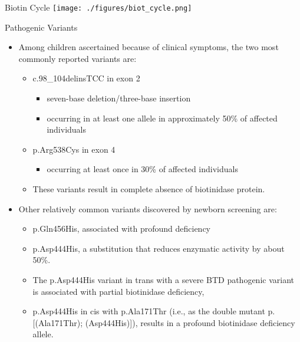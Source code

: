 \documentclass[presentation, smaller]{beamer}
\begin{document}
\begin{frame}[label={sec:orgheadline3}]{Biotin Cycle}
\texttt{[image: ./figures/biot\_cycle.png]}
\end{frame}


\begin{frame}[label={sec:orgheadline4}]{Pathogenic Variants}
\begin{itemize}
\item Among children ascertained because of clinical symptoms, the two
most commonly reported variants are:

\begin{itemize}
\item c.98\_104delinsTCC in exon 2
\begin{itemize}
\item seven-base deletion/three-base insertion
\item occurring in at least one allele in approximately 50\% of affected individuals
\end{itemize}

\item p.Arg538Cys in exon 4
\begin{itemize}
\item occurring at least once in 30\% of affected individuals
\end{itemize}

\item These variants result in complete absence of biotinidase protein.
\end{itemize}

\item Other relatively common variants discovered by newborn screening are:
\begin{itemize}
\item p.Gln456His, associated with profound deficiency

\item p.Asp444His, a substitution that reduces enzymatic activity by about 50\%.

\item The p.Asp444His variant in trans with a severe BTD pathogenic variant is associated with partial biotinidase deficiency,
\item p.Asp444His in cis with p.Ala171Thr (i.e., as the double mutant p.[(Ala171Thr); (Asp444His)]), results in a profound biotinidase deficiency allele.
\end{itemize}
\end{itemize}
\end{frame}
\end{document}
